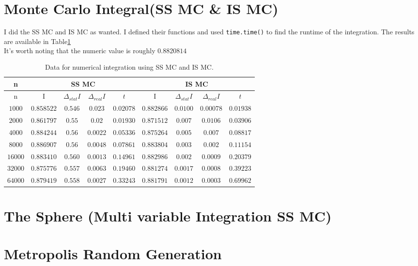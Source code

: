 \documentclass[12pt]{article}
\begin{document}
	\section{Monte Carlo Integral(SS MC \& IS MC)}
	I did the SS MC and IS MC as wanted. I defined their functions and used \texttt{time.time()} to find the 
	runtime of the integration. The results are available in Table\ref{tab:MC}\\
	It's worth noting that the numeric value is roughly $0.8820814$
	\begin{table}[h!]
		\centering
		\begin{tabular}{|c|c|c|c|c||c|c|c|c|}
			\hline
			n & \multicolumn{4}{|c||}{SS MC} & \multicolumn{4}{|c|}{IS MC} \\
			\hline
			n & I & $\Delta_{stat} I$ & $\Delta_{real} I$ & $t$ & I & $\Delta_{stat} I$ & $\Delta_{real} I$ & $t$ \\
			\hline
 			$1000$ & $0.858522$ & $0.546$ & $0.023$ & $0.02078$ & $0.882866$ & $0.0100$ & $0.00078$ & $0.01938$ \\
 			\hline
			 $2000$ & $0.861797$ & $0.55$ & $0.02$ & $0.01930$ & $0.871512$ & $0.007$ & $0.0106$ & $0.03906$ \\
			 \hline
			 $4000$ & $0.884244$ & $0.56$ & $0.0022$ & $0.05336$ & $0.875264$ & $0.005$ & $0.007$ & $0.08817$ \\
			 \hline
			 $8000$ & $0.886907$ & $0.56$ & $0.0048$ & $0.07861$ & $0.883804$ & $0.003$ & $0.002$ & $0.11154$ \\
			 \hline
			 $16000$ & $0.883410$ & $0.560$ & $0.0013$ & $0.14961$ & $0.882986$ & $0.002$ & $0.0009$ & $0.20379$ \\
			 \hline
			 $32000$ & $0.875776$ & $0.557$ & $0.0063$ & $0.19460$ & $0.881274$ & $0.0017$ & $0.0008$ & $0.39223$ \\
			 \hline
			 $64000$ & $0.879419$ & $0.558$ & $0.0027$ & $0.33243$ & $0.881791$ & $0.0012$ & $0.0003$ & $0.69962$ \\
			 \hline
		\end{tabular}
	\label{tab:MC}
	\caption{Data for numerical integration using SS MC and IS MC.}	
	\end{table}
	\section{The Sphere (Multi variable Integration SS MC)}
	
	\section{Metropolis Random Generation}
	
	
	
\end{document}
